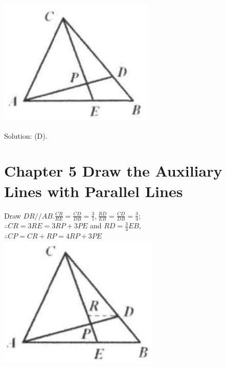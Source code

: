 \documentclass[10pt]{article}
\begin{document}
\includegraphics[max width=\textwidth, center]{2025_04_17_97bc1f7e44d93c271a88g-107(1)}

Solution: (D).

\section*{Chapter 5 Draw the Auxiliary Lines with Parallel Lines}
Draw \(D R / / A B . \frac{C R}{R E}=\frac{C D}{D B}=\frac{3}{1}, \frac{R D}{E B}=\frac{C D}{D B}=\frac{3}{4}\);\\
\(\therefore C R=3 R E=3 R P+3 P E\) and \(R D=\frac{3}{4} E B\),\\
\(\therefore C P=C R+R P=4 R P+3 P E\)\\
\includegraphics[max width=\textwidth, center]{2025_04_17_97bc1f7e44d93c271a88g-108(2)}
\end{document}
